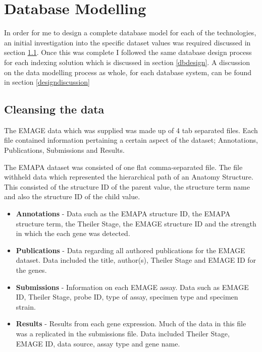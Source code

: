 \chapter{Database Modelling}\label{design}

In order for me to design a complete database model for each of the technologies, an initial investigation into the specific dataset values was required discussed in section \ref{datasetvalues}. Once this was complete I followed the same database design process for each indexing solution which is discussed in section \ref{dbdesign}. A discussion on the data modelling process as whole, for each database system, can be found in section \ref{designdiscussion}

\section{Cleansing the data}\label{datasetvalues}

The EMAGE data which was supplied was made up of 4 tab separated files. Each file contained information pertaining a certain aspect of the dataset; Annotations, Publications, Submissions and Results.

The EMAPA dataset was consisted of one flat comma-separated file. The file withheld data which represented the hierarchical path of an Anatomy Structure. This consisted of the structure ID of the parent value, the structure term name and also the structure ID of the child value.

\begin{itemize}
\item \textbf{Annotations} - Data such as the EMAPA structure ID, the EMAPA structure term, the Theiler Stage, the EMAGE structure ID and the strength in which the each gene was detected.

\item \textbf{Publications} - Data regarding all authored publications for the EMAGE dataset. Data included the title, author(s), Theiler Stage and EMAGE ID for the genes.

\item \textbf{Submissions} - Information on each EMAGE assay. Data such as EMAGE ID, Theiler Stage, probe ID, type of assay, specimen type and specimen strain.

\item \textbf{Results} - Results from each gene expression. Much of the data in this file was a replicated in the submissions file. Data included Theiler Stage, EMAGE ID, data source, assay type and gene name.
\end{itemize}

